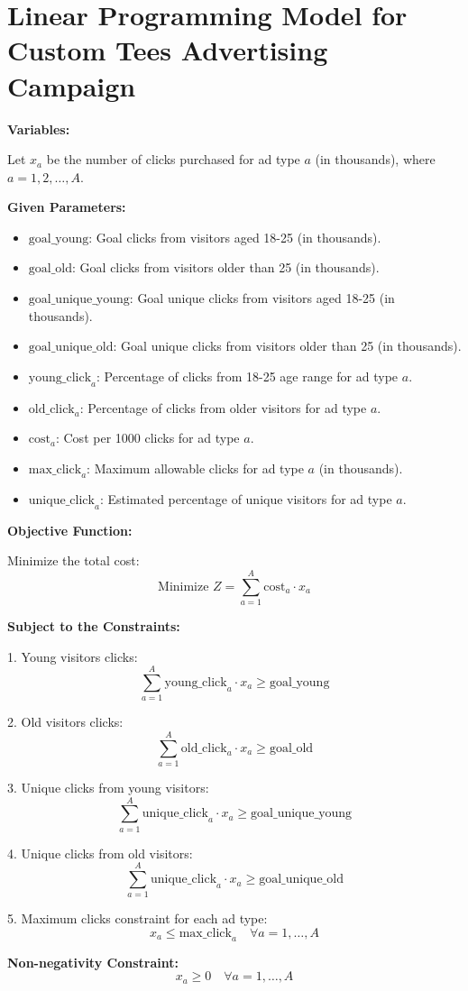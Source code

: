 \documentclass{article}
\begin{document}
\section*{Linear Programming Model for Custom Tees Advertising Campaign}

\textbf{Variables:}

Let \( x_a \) be the number of clicks purchased for ad type \( a \) (in thousands), where \( a = 1, 2, \ldots, A \).

\textbf{Given Parameters:}
\begin{itemize}
    \item \( \text{goal\_young} \): Goal clicks from visitors aged 18-25 (in thousands).
    \item \( \text{goal\_old} \): Goal clicks from visitors older than 25 (in thousands).
    \item \( \text{goal\_unique\_young} \): Goal unique clicks from visitors aged 18-25 (in thousands).
    \item \( \text{goal\_unique\_old} \): Goal unique clicks from visitors older than 25 (in thousands).
    \item \( \text{young\_click}_{a} \): Percentage of clicks from 18-25 age range for ad type \( a \).
    \item \( \text{old\_click}_{a} \): Percentage of clicks from older visitors for ad type \( a \).
    \item \( \text{cost}_{a} \): Cost per 1000 clicks for ad type \( a \).
    \item \( \text{max\_click}_{a} \): Maximum allowable clicks for ad type \( a \) (in thousands).
    \item \( \text{unique\_click}_{a} \): Estimated percentage of unique visitors for ad type \( a \).
\end{itemize}

\textbf{Objective Function:}

Minimize the total cost:
\[
\text{Minimize } Z = \sum_{a=1}^A \text{cost}_{a} \cdot x_a
\]

\textbf{Subject to the Constraints:}

1. Young visitors clicks:
\[
\sum_{a=1}^A \text{young\_click}_{a} \cdot x_a \geq \text{goal\_young}
\]

2. Old visitors clicks:
\[
\sum_{a=1}^A \text{old\_click}_{a} \cdot x_a \geq \text{goal\_old}
\]

3. Unique clicks from young visitors:
\[
\sum_{a=1}^A \text{unique\_click}_{a} \cdot x_a \geq \text{goal\_unique\_young}
\]

4. Unique clicks from old visitors:
\[
\sum_{a=1}^A \text{unique\_click}_{a} \cdot x_a \geq \text{goal\_unique\_old}
\]

5. Maximum clicks constraint for each ad type:
\[
x_a \leq \text{max\_click}_{a} \quad \forall a = 1, \ldots, A
\]

\textbf{Non-negativity Constraint:}
\[
x_a \geq 0 \quad \forall a = 1, \ldots, A
\]
\end{document}
